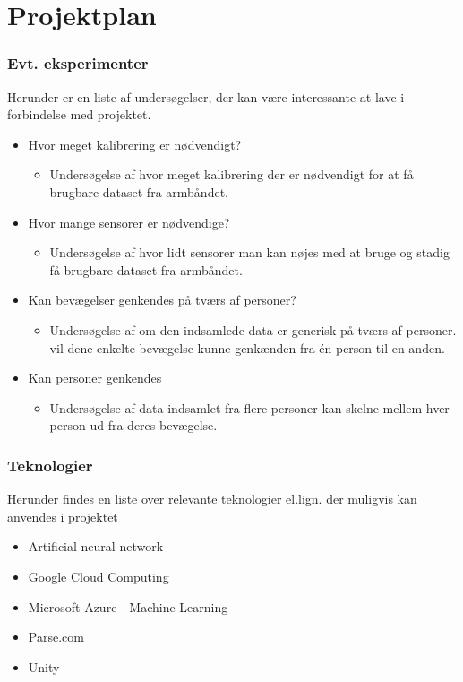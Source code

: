 \thispagestyle{fancy}
\chapter{Projektplan}
\subsection*{Evt. eksperimenter}
Herunder er en liste af undersøgelser, der kan være interessante at lave i forbindelse med projektet.
\begin{itemize}
	\item Hvor meget kalibrering er nødvendigt?
	\begin{itemize}
		\item Undersøgelse af hvor meget kalibrering der er nødvendigt for at få brugbare dataset fra armbåndet.
	\end{itemize}
	\item Hvor mange sensorer er nødvendige?
	\begin{itemize}
		\item Undersøgelse af hvor lidt sensorer man kan nøjes med at bruge og stadig få brugbare dataset fra armbåndet.
	\end{itemize}
	\item Kan bevægelser genkendes på tværs af personer?
	\begin{itemize}
		\item Undersøgelse af om den indsamlede data er generisk på tværs af personer. vil dene enkelte bevægelse kunne genkænden fra én person til en anden.
	\end{itemize}
	\item Kan personer genkendes
	\begin{itemize}
		\item Undersøgelse af data indsamlet fra flere personer kan skelne mellem hver person ud fra deres bevægelse.
		\end{itemize}
\end{itemize}

\subsection*{Teknologier}
Herunder findes en liste over relevante teknologier el.lign. der muligvis kan anvendes i projektet
\begin{itemize}
	\item Artificial neural network
	\item Google Cloud Computing
	\item Microsoft Azure - Machine Learning
	\item Parse.com
	\item Unity
\end{itemize}

